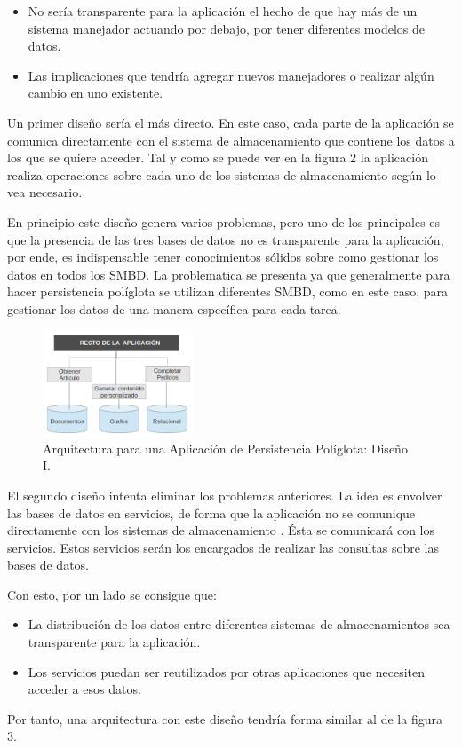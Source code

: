 \documentclass[conference]{IEEEtran}
\begin{document}
\begin{itemize}
\item  No ser\'ia transparente para la aplicaci\'on el hecho de que hay m\'as de un sistema manejador actuando por debajo, por tener diferentes modelos de datos.
\item  Las implicaciones que tendría agregar nuevos manejadores o realizar algún cambio en uno existente.
\end{itemize}

Un primer diseño ser\'ia el m\'as directo. En este caso, cada parte de la aplicaci\'on se comunica directamente con el sistema de almacenamiento que contiene los datos a los que se quiere acceder. Tal y como se puede ver en la figura 2 la aplicaci\'on realiza operaciones sobre cada uno de los sistemas de almacenamiento seg\'un lo vea necesario.

En principio este diseño genera varios problemas, pero uno de los principales es que la presencia de las tres bases de datos no es transparente para la aplicaci\'on, por ende, es indispensable tener conocimientos s\'olidos sobre como gestionar los datos en todos los SMBD. La problematica se presenta ya que generalmente para hacer persistencia pol\'iglota se utilizan diferentes SMBD, como en este caso, para gestionar los datos de una manera espec\'ifica para cada tarea.

\begin{figure}[!h]
\centering
\includegraphics[width=0.4\textwidth]{2}
\caption{Arquitectura para una Aplicaci\'on de Persistencia Pol\'iglota: Diseño I.}
\label{fig2}
\end{figure}
El segundo diseño intenta eliminar los problemas anteriores. La idea es envolver las bases de datos en servicios, de forma que la aplicaci\'on no se comunique directamente con los sistemas de almacenamiento  \cite{sistemaAlmacenamiento}. \'Esta se comunicar\'a con los servicios. Estos servicios serán los encargados de realizar las consultas sobre las bases de datos. 

Con esto, por un lado se consigue que:
\begin{itemize}
\item  La distribuci\'on de los datos entre diferentes sistemas de almacenamientos sea transparente para la aplicaci\'on.

\item  Los servicios puedan ser reutilizados por otras aplicaciones que necesiten acceder a esos datos. 
\end{itemize}
Por tanto, una arquitectura con este diseño tendría forma similar al de la figura 3.
\end{document}
